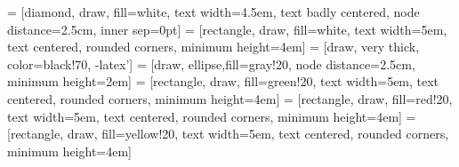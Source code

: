 \documentclass{article}
\begin{document}
\pagestyle{empty}

 = [diamond, draw, fill=white,
    text width=4.5em, text badly centered, node distance=2.5cm, inner sep=0pt]
 = [rectangle, draw, fill=white,
    text width=5em, text centered, rounded corners, minimum height=4em]
 = [draw, very thick, color=black!70, -latex']
 = [draw, ellipse,fill=gray!20, node distance=2.5cm,
    minimum height=2em]
 = [rectangle, draw, fill=green!20,
    text width=5em, text centered, rounded corners, minimum height=4em]
 = [rectangle, draw, fill=red!20,
    text width=5em, text centered, rounded corners, minimum height=4em]
 = [rectangle, draw, fill=yellow!20,
    text width=5em, text centered, rounded corners, minimum height=4em]
\end{document}
